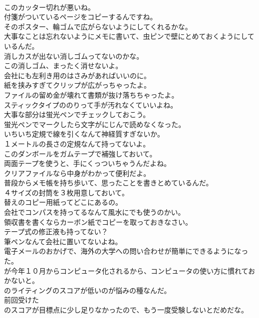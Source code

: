\documentclass[8pt]{extreport}
\begin{document}
\begin{CJK}{UTF8}{min}
\\	このカッター切れが悪いね。	
\\	付箋がついているページをコピーするんですね。	
\\	そのポスター、輪ゴムで広がらないようにしてくれるかな。	
\\	大事なことは忘れないようにメモに書いて、虫ピンで壁にとめておくようにしているんだ。	
\\	消しカスが出ない消しゴムってないのかな。	
\\	この消しゴム、まったく消せないよ。	
\\	会社にも左利き用のはさみがあればいいのに。	
\\	紙を挟みすぎてクリップが広がっちゃったよ。	
\\	ファイルの留め金が壊れて書類が抜け落ちちゃったよ。	
\\	スティックタイプののりって手が汚れなくていいよね。	
\\	大事な部分は蛍光ペンでチェックしておこう。	
\\	蛍光ペンでマークしたら文字がにじんで読めなくなった。	
\\	いちいち定規で線を引くなんて神経質すぎないか。	
\\	１メートルの長さの定規なんて持ってないよ。	
\\	このダンボールをガムテープで補強しておいて。	
\\	両面テープを使うと、手にくっついちゃうんだよね。	
\\	クリアファイルなら中身がわかって便利だよ。	
\\	普段からメモ帳を持ち歩いて、思ったことを書きとめているんだ。	
\\	４サイズの封筒を３枚用意しておいて。	
\\	替えのコピー用紙ってどこにあるの。	
\\	会社でコンパスを持ってるなんて風水にでも使うのかい。	
\\	領収書を書くならカーボン紙でコピーを取っておきなさい。	
\\	テープ式の修正液も持ってない？	
\\	筆ペンなんて会社に置いてないよね。	
\\	電子メールのおかげで、海外の大学への問い合わせが簡単にできるようになった。	
\\	が今年１０月からコンピュータ化されるから、コンピュータの使い方に慣れておかないと。	
\\	のライティングのスコアが低いのが悩みの種なんだ。	
\\	前回受けた
\\	のスコアが目標点に少し足りなかったので、もう一度受験しないとだめだな。	

\end{CJK}
\end{document}
